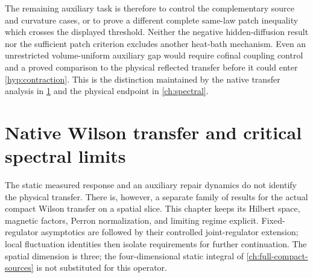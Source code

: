 \documentclass[11pt,oneside,openany]{book}
\theoremstyle{definition}
\theoremstyle{remark}
\begin{document}
The remaining auxiliary task is therefore to control the complementary
source and curvature cases, or to prove a different complete
same-law patch inequality which crosses the displayed threshold.
Neither the negative hidden-diffusion result nor the sufficient patch
criterion excludes another heat-bath mechanism. Even an unrestricted
volume-uniform auxiliary gap would require cofinal coupling control
and a proved comparison to the physical reflected transfer before it
could enter \cref{hyp:contraction}. This is the distinction maintained
by the native transfer analysis in \cref{ch:native-transfer} and the
physical endpoint in \cref{ch:spectral}.

\chapter{Native Wilson transfer and critical spectral limits}
\label{ch:native-transfer}
The static measured response and an auxiliary repair dynamics do not
identify the physical transfer. There is, however, a separate family
of results for the actual compact Wilson transfer on a spatial slice.
This chapter keeps its Hilbert space, magnetic factors, Perron
normalization, and limiting regime explicit. Fixed-regulator
asymptotics are followed by their controlled joint-regulator
extension; local fluctuation identities then isolate requirements
for further continuation. The spatial dimension is
three; the four-dimensional static integral of
\cref{ch:full-compact-sources} is not substituted for this operator.
\end{document}
